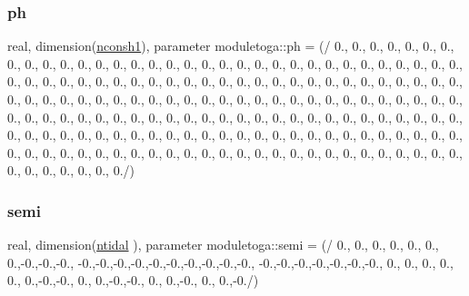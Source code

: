 \mbox{\label{namespacemoduletoga_a107a4f3812d78b4dca0cc05213daad21}} 
\subsubsection{\texorpdfstring{ph}{ph}}
{\footnotesize\ttfamily real, dimension(\mbox{\hyperlink{namespacemoduletoga_a06e41646ba24c11ab2e1b513e5c1760c}{nconsh1}}), parameter moduletoga\+::ph = (/ 0., 0., 0., 0., 0., 0., 0., 0., 0., 0., 0., 0., 0., 0., 0., 0., 0., 0., 0., 0., 0., 0., 0., 0., 0., 0., 0., 0., 0., 0., 0., 0., 0., 0., 0., 0., 0., 0., 0., 0., 0., 0., 0., 0., 0., 0., 0., 0., 0., 0., 0., 0., 0., 0., 0., 0., 0., 0., 0., 0., 0., 0., 0., 0., 0., 0., 0., 0., 0., 0., 0., 0., 0., 0., 0., 0., 0., 0., 0., 0., 0., 0., 0., 0., 0., 0., 0., 0., 0., 0., 0., 0., 0., 0., 0., 0., 0., 0., 0., 0., 0., 0., 0., 0., 0., 0., 0., 0., 0., 0., 0., 0., 0., 0., 0., 0., 0., 0., 0., 0., 0., 0., 0., 0., 0., 0., 0., 0., 0., 0., 0., 0., 0., 0., 0., 0., 0., 0., 0., 0., 0., 0., 0., 0., 0., 0., 0., 0., 0., 0., 0., 0., 0., 0., 0., 0., 0., 0., 0., 0., 0., 0., 0., 0., 0., 0., 0., 0., 0., 0./)\hspace{0.3cm}{\ttfamily [private]}}

\mbox{\label{namespacemoduletoga_a50b0081d60454bd6a0be5d7521a43c30}} 
\subsubsection{\texorpdfstring{semi}{semi}}
{\footnotesize\ttfamily real, dimension(\mbox{\hyperlink{namespacemoduletoga_ae4b0b997b6803ae8647fdd97f2dda666}{ntidal}} ), parameter moduletoga\+::semi = (/ 0., 0., 0., 0., 0., 0., 0.,-\/0.,-\/0.,-\/0., -\/0.,-\/0.,-\/0.,-\/0.,-\/0.,-\/0.,-\/0.,-\/0.,-\/0.,-\/0., -\/0.,-\/0.,-\/0.,-\/0.,-\/0.,-\/0.,-\/0., 0., 0., 0., 0., 0., 0.,-\/0.,-\/0., 0., 0.,-\/0.,-\/0., 0., 0.,-\/0., 0., 0.,-\/0./)\hspace{0.3cm}{\ttfamily [private]}}

